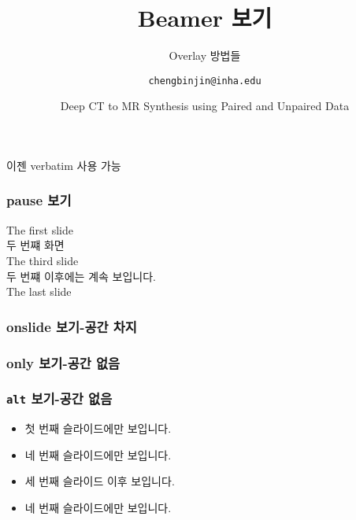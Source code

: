 \documentclass[xcolor=table]{beamer}
\title{Beamer 보기}
\subtitle{Overlay 방법들}
\author[김성빈]{\texttt{chengbinjin@inha.edu}}
\date[\today]{Deep CT to MR Synthesis using Paired and Unpaired Data}
\institute{INHA University}
\begin{document}
\begin{frame}
\titlepage
\end{frame}

\begin{frame}[fragile]
이젠 verbatim 사용 가능
\end{frame}

\begin{frame}[fragile]
\end{frame}

\begin{frame}
\frametitle{pause 보기}
The first slide \\
\pause
두 번쨰 화면 \\ 
\pause
The third slide \\
\pause[2]
두 번쨰 이후에는 계속 보입니다. \\
\pause
The last slide \\
\end{frame}

\begin{frame}
\frametitle{onslide 보기-공간 차지}
\end{frame}

\begin{frame}
\frametitle{only 보기-공간 없음}
\end{frame}

\begin{frame}
\frametitle{\texttt{alt} 보기-공간 없음}
\begin{itemize}
\item<1>{첫 번째 슬라이드에만 보입니다. \newline}
\item<2> 
{네 번째 슬라이드에만 보입니다. \newline}
\item<3->{세 번째 슬라이드 이후 보입니다. \newline}
\item<4>{네 번째 슬라이드에만 보입니다.}
\end{itemize}
\end{frame}
\end{document}
